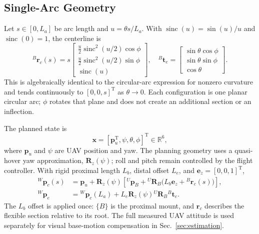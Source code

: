 \documentclass[journal,twoside]{IEEEtran}
\newcommand{\sinc}{\operatorname{sinc}}
\begin{document}
\subsection{Single-Arc Geometry}
Let $s\in[0,L_a]$ be arc length and $u=\theta s/L_a$. With $\sinc(u)=\sin(u)/u$ and $\sinc(0)=1$, the centerline is
\begin{equation}
{}^{B}\mathbf r_c(s)=s
\begin{bmatrix}
\frac{u}{2}\sinc^2(u/2)\cos\phi\\
\frac{u}{2}\sinc^2(u/2)\sin\phi\\
\sinc(u)
\end{bmatrix},\quad
{}^{B}\mathbf t_e=
\begin{bmatrix}
\sin\theta\cos\phi\\\sin\theta\sin\phi\\\cos\theta
\end{bmatrix}.
\label{eq:pcc_geometry}
\end{equation}
This is algebraically identical to the circular-arc expression for nonzero curvature and tends continuously to $[0,0,s]^{\mathrm T}$ as $\theta\to0$. Each configuration is one planar circular arc; $\phi$ rotates that plane and does not create an additional section or an inflection.

The planned state is
\begin{equation}
\mathbf x=[\mathbf p_u^{\mathrm T},\psi,\theta,\phi]^{\mathrm T}\in\mathbb R^6,
\label{eq:planning_state}
\end{equation}
where $\mathbf p_u$ and $\psi$ are UAV position and yaw. The planning geometry uses a quasi-hover yaw approximation, $\mathbf R_z(\psi)$; roll and pitch remain controlled by the flight controller. With rigid proximal length $L_b$, distal offset $L_e$, and $\mathbf e_z=[0,0,1]^{\mathrm T}$,
\begin{align}
{}^{W}\mathbf p_c(s)&=\mathbf p_u+\mathbf R_z(\psi)
\left[{}^{U}\mathbf p_B+{}^{U}\mathbf R_B
\big(L_b\mathbf e_z+{}^{B}\mathbf r_c(s)\big)\right],\label{eq:world_centerline}\\
{}^{W}\mathbf p_e&={}^W\mathbf p_c(L_a)
+L_e\mathbf R_z(\psi){}^{U}\mathbf R_B{}^{B}\mathbf t_e.
\label{eq:world_tool}
\end{align}
The $L_b$ offset is applied once: $\{B\}$ is the proximal mount, and $\mathbf r_c$ describes the flexible section relative to its root. The full measured UAV attitude is used separately for visual base-motion compensation in Sec.~\ref{sec:estimation}.
\end{document}
